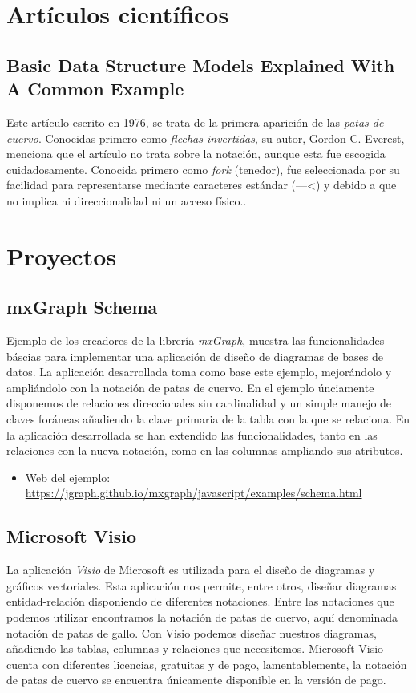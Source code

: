 
\section{Artículos científicos}

\subsection{Basic Data Structure Models Explained With A Common Example}
Este artículo escrito en 1976, se trata de la primera aparición de las \emph{patas de cuervo}. Conocidas primero como \emph{flechas invertidas}, su autor, Gordon C. Everest, menciona que el artículo no trata sobre la notación, aunque esta fue escogida cuidadosamente. Conocida primero como \emph{fork} (tenedor), fue seleccionada por su facilidad para representarse mediante caracteres estándar (---<) y debido a que no implica ni direccionalidad ni un acceso físico.\cite{ge-bdsm}.

\section{Proyectos}

\subsection{mxGraph Schema}
Ejemplo de los creadores de la librería \emph{mxGraph}, muestra las funcionalidades báscias para implementar una aplicación de diseño de diagramas de bases de datos. La aplicación desarrollada toma como base este ejemplo, mejorándolo y ampliándolo con la notación de patas de cuervo. En el ejemplo únciamente disponemos de relaciones direccionales sin cardinalidad y un simple manejo de claves foráneas añadiendo la clave primaria de la tabla con la que se relaciona. En la aplicación desarrollada se han extendido las funcionalidades, tanto en las relaciones con la nueva notación, como en las columnas ampliando sus atributos.

\begin{itemize}
    \item Web del ejemplo: \url{https://jgraph.github.io/mxgraph/javascript/examples/schema.html}
\end{itemize}

\subsection{Microsoft Visio}
La aplicación \emph{Visio} de Microsoft es utilizada para el diseño de diagramas y gráficos vectoriales. Esta aplicación nos permite, entre otros, diseñar diagramas entidad-relación disponiendo de diferentes notaciones. Entre las notaciones que podemos utilizar encontramos la notación de patas de cuervo, aquí denominada notación de patas de gallo. Con Visio podemos diseñar nuestros diagramas, añadiendo las tablas, columnas y relaciones que necesitemos. Microsoft Visio cuenta con diferentes licencias, gratuitas y de pago, lamentablemente, la notación de patas de cuervo se encuentra únicamente disponible en la versión de pago.

